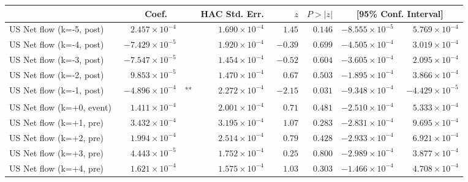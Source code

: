 \documentclass[10pt]{article}
\begin{document}
\noindent\begin{tabular}{@{}l|r@{}l rrr rr@{}}
\hline
 & \multicolumn{2}{c}{Coef.} & HAC Std. Err. & $z$ & $P>|z|$ & \multicolumn{2}{c}{[95\% Conf. Interval]} \\
\hline
US Net flow (k=-5, post) & $\phantom{-}2.457\!\times\!10^{-4}$ & \textsuperscript{} & $\phantom{-}1.690\!\times\!10^{-4}$ & $\phantom{-}1.45$ & $0.146$ & $-8.555\!\times\!10^{-5}$ & $\phantom{-}5.769\!\times\!10^{-4}$ \\
US Net flow (k=-4, post) & $-7.429\!\times\!10^{-5}$ & \textsuperscript{} & $\phantom{-}1.920\!\times\!10^{-4}$ & $-0.39$ & $0.699$ & $-4.505\!\times\!10^{-4}$ & $\phantom{-}3.019\!\times\!10^{-4}$ \\
US Net flow (k=-3, post) & $-7.547\!\times\!10^{-5}$ & \textsuperscript{} & $\phantom{-}1.454\!\times\!10^{-4}$ & $-0.52$ & $0.604$ & $-3.605\!\times\!10^{-4}$ & $\phantom{-}2.095\!\times\!10^{-4}$ \\
US Net flow (k=-2, post) & $\phantom{-}9.853\!\times\!10^{-5}$ & \textsuperscript{} & $\phantom{-}1.470\!\times\!10^{-4}$ & $\phantom{-}0.67$ & $0.503$ & $-1.895\!\times\!10^{-4}$ & $\phantom{-}3.866\!\times\!10^{-4}$ \\
US Net flow (k=-1, post) & $-4.896\!\times\!10^{-4}$ & \textsuperscript{**} & $\phantom{-}2.272\!\times\!10^{-4}$ & $-2.15$ & $0.031$ & $-9.348\!\times\!10^{-4}$ & $-4.429\!\times\!10^{-5}$ \\
US Net flow (k=+0, event) & $\phantom{-}1.411\!\times\!10^{-4}$ & \textsuperscript{} & $\phantom{-}2.001\!\times\!10^{-4}$ & $\phantom{-}0.71$ & $0.481$ & $-2.510\!\times\!10^{-4}$ & $\phantom{-}5.333\!\times\!10^{-4}$ \\
US Net flow (k=+1, pre) & $\phantom{-}3.432\!\times\!10^{-4}$ & \textsuperscript{} & $\phantom{-}3.195\!\times\!10^{-4}$ & $\phantom{-}1.07$ & $0.283$ & $-2.831\!\times\!10^{-4}$ & $\phantom{-}9.695\!\times\!10^{-4}$ \\
US Net flow (k=+2, pre) & $\phantom{-}1.994\!\times\!10^{-4}$ & \textsuperscript{} & $\phantom{-}2.514\!\times\!10^{-4}$ & $\phantom{-}0.79$ & $0.428$ & $-2.933\!\times\!10^{-4}$ & $\phantom{-}6.921\!\times\!10^{-4}$ \\
US Net flow (k=+3, pre) & $\phantom{-}4.443\!\times\!10^{-5}$ & \textsuperscript{} & $\phantom{-}1.752\!\times\!10^{-4}$ & $\phantom{-}0.25$ & $0.800$ & $-2.989\!\times\!10^{-4}$ & $\phantom{-}3.877\!\times\!10^{-4}$ \\
US Net flow (k=+4, pre) & $\phantom{-}1.621\!\times\!10^{-4}$ & \textsuperscript{} & $\phantom{-}1.575\!\times\!10^{-4}$ & $\phantom{-}1.03$ & $0.303$ & $-1.466\!\times\!10^{-4}$ & $\phantom{-}4.708\!\times\!10^{-4}$ \\

\end{tabular}
\end{document}
